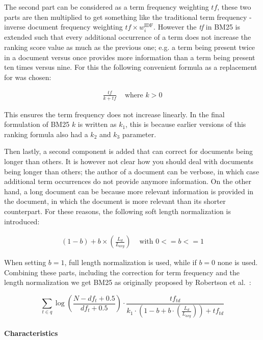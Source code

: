 The second part can be considered as a term frequency weighting $tf$, these two parts are then multiplied to get something like the traditional term frequency - inverse document frequency weighting $tf \times w_i^{\text{IDF}}$.
However the \textit{tf} in BM25 is extended such that every additional occurrence of a term does not increase the ranking score value as much as the previous one; e.g. a term being present twice in a document versus once provides more information than a term being present ten times versus nine. For this the following convenient formula as a replacement for  was chosen:

\begin{align}
	\frac{tf}{k+tf} & \text{ where } k>0
\end{align}

This ensures the term frequency does not increase linearly. In the final formulation of BM25 $k$ is written as $k_1$, this is because earlier versions of this ranking formula also had a $k_2$ and $k_3$ parameter. 

Then lastly, a second component is added that can correct for documents being longer than others. It is however not clear how you should deal with documents being longer than others; the author of a document can be verbose, in which case additional term occurrences do not provide anymore information. On the other hand, a long document can be because more relevant information is provided in the document, in which the document is more relevant than its shorter counterpart. For these reasons, the following soft length normalization is introduced:

\begin{align}
	\left(1-b\right) + b \times \left(\frac{L_d}{L_{avg}}\right) & \text{ with } 0 <= b <= 1
\end{align}

When setting $b=1$, full length normalization is used, while if $b=0$ none is used. Combining these parts, including the correction for term frequency and the length normalization we get BM25 as originally proposed by Robertson et al.~\cite{bm25-robertson}:

\begin{equation}
	\label{bm25-robertson}
	\sum_{t\in q} \log\left(\frac{N-df_t+0.5}{df_t+0.5}\right)\cdot\frac{tf_{td}}{k_1\cdot\left(1-b+b\cdot\left(\frac{L_d}{L_{avg}}\right)\right) + tf_{td}}
\end{equation}

\paragraph{Characteristics}

